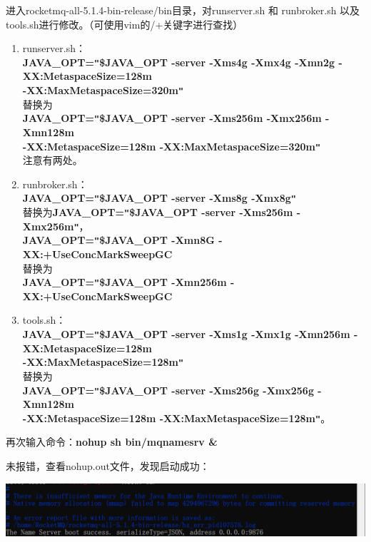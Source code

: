 \documentclass[11pt, a4paper, oneside, fontset=none]{ctexbook}
\begin{document}
进入rocketmq-all-5.1.4-bin-release/bin目录，对runserver.sh 和 runbroker.sh 以及 tools.sh进行修改。（可使用vim的/+关键字进行查找）
\begin{enumerate}
  \item runserver.sh：
  \\{\bfseries\kaishu JAVA\_OPT=\texttt{"}\${JAVA\_OPT} -server -Xms4g -Xmx4g -Xmn2g -XX:MetaspaceSize=128m 
  \\-XX:MaxMetaspaceSize=320m\texttt{"}}
  \\替换为
  \\{\bfseries\kaishu JAVA\_OPT=\texttt{"}\${JAVA\_OPT} -server -Xms256m -Xmx256m -Xmn128m 
  \\-XX:MetaspaceSize=128m -XX:MaxMetaspaceSize=320m\texttt{"}}
  \\注意有两处。
  \item runbroker.sh：
  \\{\bfseries\kaishu JAVA\_OPT=\texttt{"}\${JAVA\_OPT} -server -Xms8g -Xmx8g\texttt{"}}
  \\替换为{\bfseries\kaishu JAVA\_OPT=\texttt{"}\${JAVA\_OPT} -server -Xms256m -Xmx256m\texttt{"}}，
  \\{\bfseries\kaishu JAVA\_OPT=\texttt{"}\${JAVA\_OPT} -Xmn8G -XX:+UseConcMarkSweepGC }
  \\替换为
  \\{\bfseries\kaishu JAVA\_OPT=\texttt{"}\${JAVA\_OPT} -Xmn256m -XX:+UseConcMarkSweepGC }
  \item tools.sh：
  \\{\bfseries\kaishu JAVA\_OPT=\texttt{"}\${JAVA\_OPT} -server -Xms1g -Xmx1g -Xmn256m -XX:MetaspaceSize=128m 
  \\-XX:MaxMetaspaceSize=128m\texttt{"}}
  \\替换为
  \\{\bfseries\kaishu JAVA\_OPT=\texttt{"}\${JAVA\_OPT} -server -Xms256g -Xmx256g -Xmn128m 
  \\-XX:MetaspaceSize=128m -XX:MaxMetaspaceSize=128m\texttt{"}}。
\end{enumerate}

再次输入命令：{\bfseries\kaishu nohup sh bin/mqnamesrv \&}

未报错，查看nohup.out文件，发现启动成功：
\begin{center}
  \begin{minipage}{\textwidth}
    \center
    \includegraphics[width=\textwidth]{picture/名称服务器启动成功.png}
    \captionsetup{hypcap=false}
    \label{fig:名称服务器启动成功}
  \end{minipage}
\end{center}
\end{document}
